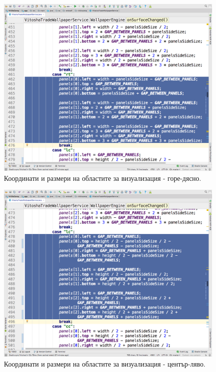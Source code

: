 \documentclass[book,14pt,oneside,openany]{memoir}
\begin{document}
\begin{figure}[h]
  \centering
  \includegraphics[height=0.45\pdfpageheight]{pic0070}
  \caption{Координати и размери на областите за визуализация - горе-дясно.}
\label{fig:pic0070}
\end{figure}
\FloatBarrier

\begin{figure}[h]
  \centering
  \includegraphics[height=0.45\pdfpageheight]{pic0071}
  \caption{Координати и размери на областите за визуализация - център-ляво.}
\label{fig:pic0071}
\end{figure}
\FloatBarrier
\end{document}
